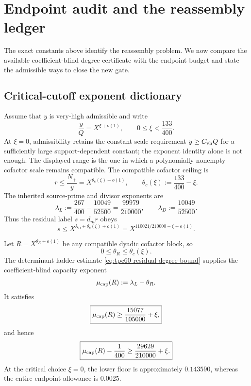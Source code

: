 \section{Endpoint audit and the reassembly ledger}
\label{sec:tpc60-endpoint-ledger}

The exact constants above identify the reassembly problem.  We now compare
the available coefficient-blind degree certificate with the endpoint
budget and state the admissible ways to close the new gate.

\subsection{Critical-cutoff exponent dictionary}

Assume that \(y\) is very-high admissible and write
\begin{equation}
 \frac yQ=X^{\xi+o(1)},
 \qquad 0\le\xi<\frac{133}{400}.
 \label{eq:tpc60-xi-cutoff}
\end{equation}
At \(\xi=0\), admissibility retains the constant-scale requirement
\(y\ge C_{\rm vh}Q\) for a sufficiently large support-dependent constant;
the exponent identity alone is not enough.  The displayed range is the one
in which a polynomially nonempty cofactor scale remains compatible.
The compatible cofactor ceiling is
\begin{equation}
 r\le\frac{N_+}{y}
 =X^{\theta_c(\xi)+o(1)},
 \qquad
 \theta_c(\xi):=\frac{133}{400}-\xi.
 \label{eq:tpc60-compatible-cofactor-ceiling}
\end{equation}
The inherited source-prime and divisor exponents are
\begin{equation}
 \lambda_L
 :=\frac{267}{400}-\frac{10049}{52500}
 =\frac{99979}{210000},
 \qquad
 \lambda_D:=\frac{10049}{52500}.
 \label{eq:tpc60-LD-exponents}
\end{equation}
Thus the residual label \(s=d_mr\) obeys
\begin{equation}
 s\le
 X^{\lambda_D+\theta_c(\xi)+o(1)}
 =X^{110021/210000-\xi+o(1)}.
 \label{eq:tpc60-residual-label-ceiling}
\end{equation}

Let \(R=X^{\theta_R+o(1)}\) be any compatible dyadic cofactor block, so
\begin{equation}
 0\le\theta_R\le\theta_c(\xi).
 \label{eq:tpc60-compatible-thetaR}
\end{equation}
The determinant-ladder estimate
\eqref{eq:tpc60-residual-degree-bound} supplies the coefficient-blind
capacity exponent
\begin{equation}
 \mu_{\rm cap}(R)
 :=\lambda_L-\theta_R.
 \label{eq:tpc60-capacity-exponent}
\end{equation}
It satisfies
\begin{equation}
 \boxed{
 \mu_{\rm cap}(R)
 \ge\frac{15077}{105000}+\xi,}
 \label{eq:tpc60-capacity-floor}
\end{equation}
and hence
\begin{equation}
 \boxed{
 \mu_{\rm cap}(R)-\frac1{400}
 \ge\frac{29629}{210000}+\xi.}
 \label{eq:tpc60-capacity-budget-gap}
\end{equation}
At the critical choice \(\xi=0\), the lower floor is approximately
\(0.143590\), whereas the entire endpoint allowance is \(0.0025\).

